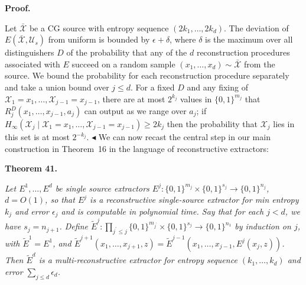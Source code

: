 \documentclass[10pt,a4paper]{article}
\begin{document}



\par\medskip\noindent\textbf{Proof.}\par




Let $\bar{\mathcal{X}}$ be a CG source with entropy sequence $(2k_{1},\ldots,2k_{d})$. The deviation of $E(\bar{\mathcal{X}},\mathcal{U}_{s})$ from uniform is bounded by $\epsilon+\delta$, where $\delta$ is the maximum over all distinguishers $D$ of the probability that any of the $d$ reconstruction procedures associated with $E$ succeed on a random sample $(x_{1},\ldots,x_{d})\sim\bar{\mathcal{X}}$ from the source. We bound the probability for each reconstruction procedure separately and take a union bound over $j\leq d$. For a fixed $D$ and any fixing of $\mathcal{X}_{1}=x_{1},\ldots,\mathcal{X}_{j-1}=x_{j-1}$, there are at most $2^{k_{j}}$ values in $\{0,1\}^{m_{j}}$ that $R_{j}^{D}(x_{1},\ldots,x_{j-1},a_{j})$ can output as we range over $a_{j}$; if $H_{\infty}(\mathcal{X}_{j}\mid\mathcal{X}_{1}=x_{1},\ldots,\mathcal{X}_{j-1}=x_{j-1})\geq 2k_{j}$ then the probability that $\mathcal{X}_{j}$ lies in this set is at most $2^{-k_{j}}$.
$\blacktriangleleft$
We can now recast the central step in our main construction in Theorem 16 in the language of reconstructive extractors:\par





\par\medskip\noindent\textbf{
\textbf{Theorem 41}\textbf{.}
}\par



\emph{Let $E^{1},\ldots,E^{d}$ be single source extractors $E^{j}:\{0,1\}^{m_{j}}\times\{0,1\}^{s_{j}}\to\{0,1\}^{n_{j}}$, $d=O(1)$, so that $E^{j}$ is a reconstructive single-source extractor for min entropy $k_{j}$ and error $\epsilon_{j}$ and is computable in polynomial time. Say that for each $j<d$, we have $s_{j}=n_{j+1}$. Define $\tilde{E}^{j}:\prod_{j^{\prime}\leq j}\{0,1\}^{m_{j^{\prime}}}\times\{0,1\}^{s_{j}}\to\{0,1\}^{n_{1}}$ by induction on $j$, with $\tilde{E}^{1}=E^{1}$, and $\tilde{E}^{j+1}(x_{1},\ldots,x_{j+1},z)=\tilde{E}^{j-1}(x_{1},\ldots,x_{j-1},E^{j}(x_{j},z))$. Then $\tilde{E}^{d}$ is a multi-reconstructive extractor for entropy sequence $(k_{1},\ldots,k_{d})$ and error $\sum_{j\leq d}\epsilon_{d}$.}\par
\end{document}

